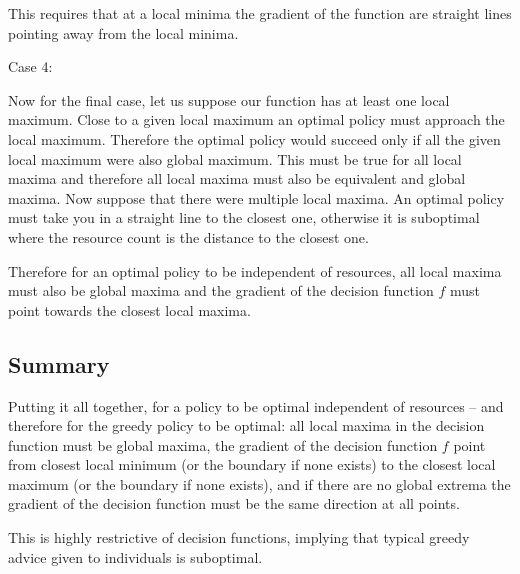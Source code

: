 

This requires that at a local minima the gradient of the function are straight lines pointing away from the local minima. 

Case 4:

Now for the final case, let us suppose our function has at least one local maximum. Close to a given local maximum an optimal policy must approach the local maximum. Therefore the optimal policy would succeed only if all the given local maximum were also global maximum. This must be true for all local maxima and therefore all local maxima must also be equivalent and global maxima. Now suppose that there were multiple local maxima. An optimal policy must take you in a straight line to the closest one, otherwise it is suboptimal where the resource count is the distance to the closest one.

Therefore for an optimal policy to be independent of resources, all local maxima must also be global maxima and the gradient of the decision function $f$ must point towards the closest local maxima.

\subsection{Summary}
Putting it all together, for a policy to be optimal independent of resources -- and therefore for the greedy policy to be optimal: all local maxima in the decision function must be global maxima, the gradient of the decision function $f$ point from closest local minimum (or the boundary if none exists) to the closest local maximum (or the boundary if none exists), and if there are no global extrema the gradient of the decision function must be the same direction at all points.

This is highly restrictive of decision functions, implying that typical greedy advice given to individuals is suboptimal.
